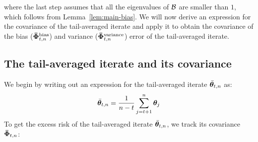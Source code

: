where the last step assumes that all the eigenvalues of $\mathcal{B}$ are smaller than $1$, which follows from Lemma~\ref{lem:main-bias}.
\fi
\fi
We will now derive an expression for the covariance of the tail-averaged iterate and apply it to obtain the covariance of the bias ($\boldsymbol{\bar{\Phi}}_{t,n}^{\text{bias}}$) and variance ($\boldsymbol{\bar{\Phi}}_{t,n}^{\text{variance}}$) error of the tail-averaged iterate.
\subsection{The tail-averaged iterate and its covariance}
We begin by writing out an expression for the tail-averaged iterate ${\bar{\boldsymbol{\theta}}}_{t,n}$ as: 
\begin{align*}
{\bar{\boldsymbol{\theta}}}_{t,n}=\frac{1}{n-t}\sum_{j=t+1}^n\boldsymbol{\theta}_j
\end{align*}
To get the excess risk of the tail-averaged iterate ${\bar{\boldsymbol{\theta}}}_{t,n}$, we track its covariance $\boldsymbol{\bar{\Phi}}_{t,n}$:
